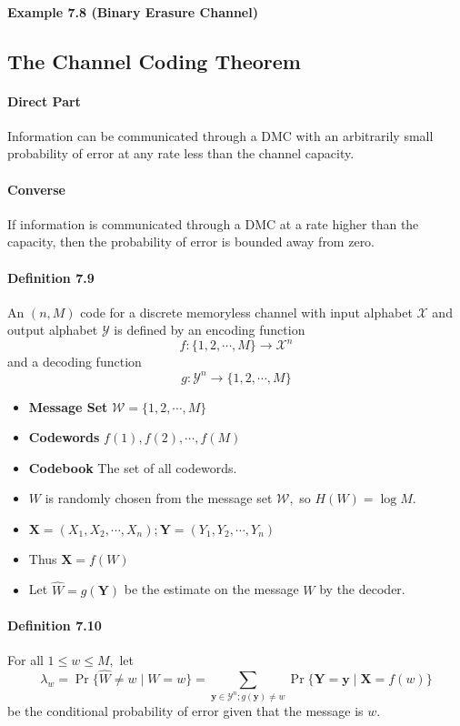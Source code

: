 \documentclass[8pt]{article}
\begin{document}
\paragraph{Example 7.8 (Binary Erasure Channel)}

\subsection{The Channel Coding Theorem}
\paragraph{Direct Part} Information can be communicated through a DMC with an arbitrarily small probability of error at any rate less than the channel capacity.
\paragraph{Converse} If information is communicated through a DMC at a rate higher than the capacity, then the probability of error is bounded away from zero.

\paragraph{Definition 7.9} An $(n, M)$ code for a discrete memoryless channel with input alphabet $\mathcal{X}$ and output alphabet $\mathcal{Y}$ is defined by an encoding function
$$
f:\{1,2, \cdots, M\} \rightarrow \mathcal{X}^{n}
$$
and a decoding function
$$
g: \mathcal{Y}^{n} \rightarrow\{1,2, \cdots, M\}
$$
\begin{itemize}
	\item \textbf{Message Set} $\mathcal{W}=\{1,2, \cdots, M\}$
	\item \textbf{Codewords} $f(1), f(2), \cdots, f(M)$
	\item \textbf{Codebook} The set of all codewords.
	\item $W$ is randomly chosen from the message set $\mathcal{W},$ so $H(W)=\log M$.
	\item $\mathbf{X}=\left(X_{1}, X_{2}, \cdots, X_{n}\right) ; \mathbf{Y}=\left(Y_{1}, Y_{2}, \cdots, Y_{n}\right)$
	\item Thus $\mathbf{X}=f(W)$
	\item Let $\hat{W}=g(\mathbf{Y})$ be the estimate on the message $W$ by the decoder.
\end{itemize}

\paragraph{Definition 7.10} For all $1 \leq w \leq M,$ let
$$
\lambda_{w}=\operatorname{Pr}\{\hat{W} \neq w \mid W=w\}=\sum_{\mathbf{y} \in \mathcal{Y}^{n} ; g(\mathbf{y}) \neq w} \operatorname{Pr}\{\mathbf{Y}=\mathbf{y} \mid \mathbf{X}=f(w)\}
$$
be the conditional probability of error given that the message is $w$.
\end{document}
